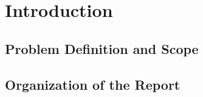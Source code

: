 \chapter{Introduction}
\label{ch:intro}




\section{Problem Definition and Scope}
\label{sec:scope}


\section{Organization of the Report}
\label{sec:organization}